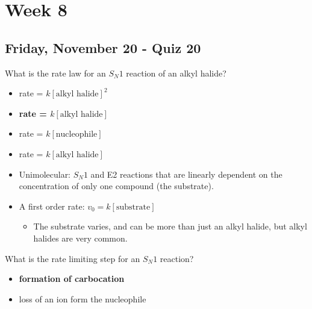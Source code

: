 \documentclass[12pt,a4paper]{article}
\begin{document}
\tableofcontents
\cleardoublepage
\fancyhead{}
\clearpage
\section*{Week 8}
{}

\subsection{Friday, November 20 - Quiz 20}
\begin{enumerate}
    {\color{G-Moon}\item What is the rate law for an \(S_N1\) reaction of an alkyl halide?
    \begin{itemize}
        \item rate = \(k[\text{alkyl halide}]^2\)
        \item {\color{o-Sun}\textbf{ rate = \(k[\text{alkyl halide}]\)}}
        \item rate = \(k[\text{nucleophile}]\)
        \item rate = \(k[\text{alkyl halide}]\)
    \end{itemize}}
        \begin{itemize}
            \item Unimolecular: \(S_N1\) and E2 reactions that are linearly dependent on the concentration of only one compound (the substrate).
            \item A first order rate: \(v_0=k[\text{substrate}]\) 
                \begin{itemize}
                    \item The substrate varies, and can be more than just an alkyl halide, but alkyl halides are very common.
                \end{itemize}
        \end{itemize}
    {\color{G-Moon}\item What is the rate limiting step for an \(S_N1\) reaction?
    \begin{itemize}
        \item {\color{o-Sun}\textbf{formation of carbocation}}
        \item loss of an  ion form the nucleophile

\end{itemize}}
\end{enumerate}
\end{document}
